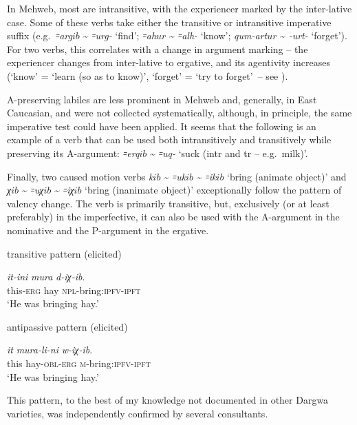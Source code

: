 \documentclass[output=paper]{langsci/langscibook}
\begin{document}
In Mehweb, most  are intransitive, with the
experiencer marked by the inter-lative case. Some of these verbs take
either the transitive or intransitive imperative suffix (e.g.\
\emph{꞊arg\(ib\)} \textasciitilde{} \emph{꞊urg-} `find'; \emph{꞊ah\(ur\)}
\textasciitilde{} \emph{꞊alh-} `know'; \emph{qum-art\(ur\)}
\textasciitilde{} \emph{-urt-} `forget'). For two verbs, this correlates
with a change in argument marking – the experiencer changes from
inter-lative to ergative, and its agentivity increases (`know' = `learn
(so as to know)', `forget' = `try to forget'~– see \citealt{ganenkov2019}).

A-preserving labiles are less prominent in Mehweb and, generally, in
East Caucasian, and were not collected systematically, although, in
principle, the same imperative test could have been applied. It seems
that the following is an
\mbox{example} of a verb that can be used both
intransitively and transitively while preserving its A-argument:
\emph{꞊erq\(ib\)} \textasciitilde{} \emph{꞊uq-} `suck (intr and tr – e.g.\ milk)'.

Finally, two caused motion verbs \emph{k\(ib\)} \textasciitilde{}
\emph{꞊uk\(ib\)} \textasciitilde{} \emph{꞊ik\(ib\)} `bring
(animate object)' and \emph{χ\(ib\)} \textasciitilde{} \emph{꞊uχ\(ib\)}
\textasciitilde{} \emph{꞊iχ\(ib\)} `bring (inanimate object)' exceptionally
follow the \isi{antipassive} pattern of valency change. The verb is primarily
transitive, but, exclusively (or at least preferably) in the
imperfective, it can also be used with the A-argument in the nominative
and the P-argument in the ergative.

\ea %
transitive pattern (elicited)

\gll \emph{it-ini} \emph{mura} \emph{d-iχ-ib}.\\
this-\textsc{erg} hay \textsc{npl}-bring:\textsc{ipfv}-\textsc{ipft}\\
\glt `He was bringing hay.'

\ex %
antipassive pattern (elicited)

\gll \emph{it} \emph{mura-li-ni} \emph{w-iχ-ib}.\\
this hay-\textsc{obl}-\textsc{erg} \textsc{m}-bring:\textsc{ipfv}-\textsc{ipft}\\
\glt `He was bringing hay.'\pagebreak[4]
\z

This pattern, to the best of my knowledge not documented in other Dargwa
varieties, was independently confirmed by several consultants.
\end{document}
